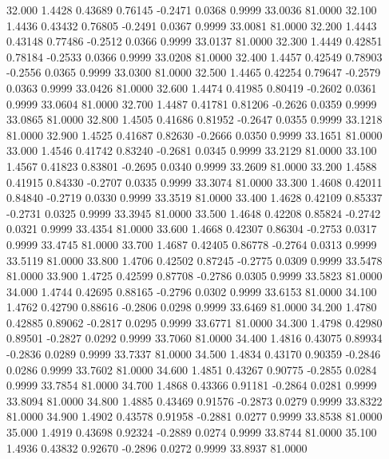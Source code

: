   32.000   1.4428   0.43689   0.76145  -0.2471   0.0368   0.9999  33.0036  81.0000
  32.100   1.4436   0.43432   0.76805  -0.2491   0.0367   0.9999  33.0081  81.0000
  32.200   1.4443   0.43148   0.77486  -0.2512   0.0366   0.9999  33.0137  81.0000
  32.300   1.4449   0.42851   0.78184  -0.2533   0.0366   0.9999  33.0208  81.0000
  32.400   1.4457   0.42549   0.78903  -0.2556   0.0365   0.9999  33.0300  81.0000
  32.500   1.4465   0.42254   0.79647  -0.2579   0.0363   0.9999  33.0426  81.0000
  32.600   1.4474   0.41985   0.80419  -0.2602   0.0361   0.9999  33.0604  81.0000
  32.700   1.4487   0.41781   0.81206  -0.2626   0.0359   0.9999  33.0865  81.0000
  32.800   1.4505   0.41686   0.81952  -0.2647   0.0355   0.9999  33.1218  81.0000
  32.900   1.4525   0.41687   0.82630  -0.2666   0.0350   0.9999  33.1651  81.0000
  33.000   1.4546   0.41742   0.83240  -0.2681   0.0345   0.9999  33.2129  81.0000
  33.100   1.4567   0.41823   0.83801  -0.2695   0.0340   0.9999  33.2609  81.0000
  33.200   1.4588   0.41915   0.84330  -0.2707   0.0335   0.9999  33.3074  81.0000
  33.300   1.4608   0.42011   0.84840  -0.2719   0.0330   0.9999  33.3519  81.0000
  33.400   1.4628   0.42109   0.85337  -0.2731   0.0325   0.9999  33.3945  81.0000
  33.500   1.4648   0.42208   0.85824  -0.2742   0.0321   0.9999  33.4354  81.0000
  33.600   1.4668   0.42307   0.86304  -0.2753   0.0317   0.9999  33.4745  81.0000
  33.700   1.4687   0.42405   0.86778  -0.2764   0.0313   0.9999  33.5119  81.0000
  33.800   1.4706   0.42502   0.87245  -0.2775   0.0309   0.9999  33.5478  81.0000
  33.900   1.4725   0.42599   0.87708  -0.2786   0.0305   0.9999  33.5823  81.0000
  34.000   1.4744   0.42695   0.88165  -0.2796   0.0302   0.9999  33.6153  81.0000
  34.100   1.4762   0.42790   0.88616  -0.2806   0.0298   0.9999  33.6469  81.0000
  34.200   1.4780   0.42885   0.89062  -0.2817   0.0295   0.9999  33.6771  81.0000
  34.300   1.4798   0.42980   0.89501  -0.2827   0.0292   0.9999  33.7060  81.0000
  34.400   1.4816   0.43075   0.89934  -0.2836   0.0289   0.9999  33.7337  81.0000
  34.500   1.4834   0.43170   0.90359  -0.2846   0.0286   0.9999  33.7602  81.0000
  34.600   1.4851   0.43267   0.90775  -0.2855   0.0284   0.9999  33.7854  81.0000
  34.700   1.4868   0.43366   0.91181  -0.2864   0.0281   0.9999  33.8094  81.0000
  34.800   1.4885   0.43469   0.91576  -0.2873   0.0279   0.9999  33.8322  81.0000
  34.900   1.4902   0.43578   0.91958  -0.2881   0.0277   0.9999  33.8538  81.0000
  35.000   1.4919   0.43698   0.92324  -0.2889   0.0274   0.9999  33.8744  81.0000
  35.100   1.4936   0.43832   0.92670  -0.2896   0.0272   0.9999  33.8937  81.0000
